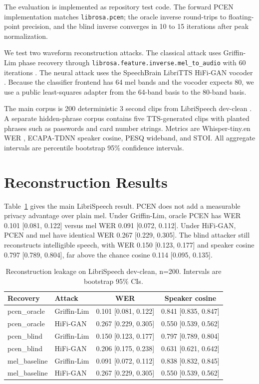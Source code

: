 \documentclass[twocolumn]{article}
\begin{document}
The evaluation is implemented as repository test code. The forward PCEN
implementation matches \texttt{librosa.pcen}; the oracle inverse round-trips
to floating-point precision, and the blind inverse converges in 10 to 15
iterations after peak normalization.

We test two waveform reconstruction attacks. The classical attack uses
Griffin-Lim phase recovery through \texttt{librosa.feature.inverse.mel\_to\_audio}
with 60 iterations \cite{griffinlim1984}. The neural attack uses the
SpeechBrain LibriTTS HiFi-GAN vocoder \cite{kong2020hifigan,speechbrain2021}.
Because the classifier frontend has 64 mel bands and the vocoder expects 80, we
use a public least-squares adapter from the 64-band basis to the 80-band basis.

The main corpus is 200 deterministic 3 second clips from LibriSpeech dev-clean
\cite{panayotov2015librispeech}. A separate hidden-phrase corpus contains five
TTS-generated clips with planted phrases such as passwords and
card number strings. Metrics are Whisper-tiny.en WER
\cite{radford2022whisper}, ECAPA-TDNN speaker cosine, PESQ wideband, and STOI.
All aggregate intervals are percentile bootstrap 95\% confidence intervals.

\section{Reconstruction Results}

Table~\ref{tab:privacy} gives the main LibriSpeech result. PCEN does not add a
measurable privacy advantage over plain mel. Under Griffin-Lim, oracle PCEN
has WER 0.101 [0.081, 0.122] versus mel WER 0.091 [0.072, 0.112]. Under
HiFi-GAN, PCEN and mel have identical WER 0.267 [0.229, 0.305]. The blind
attacker still reconstructs intelligible speech, with WER 0.150 [0.123,
0.177] and speaker cosine 0.797 [0.789, 0.804], far above the chance cosine
0.114 [0.095, 0.135].

\begin{table}[t]
\centering
\tiny
\setlength{\tabcolsep}{2pt}
\begin{tabular}{llcc}
\toprule
Recovery & Attack & WER & Speaker cosine \\
\midrule
pcen\_oracle & Griffin-Lim & 0.101 [0.081, 0.122] & 0.841 [0.835, 0.847] \\
pcen\_oracle & HiFi-GAN & 0.267 [0.229, 0.305] & 0.550 [0.539, 0.562] \\
pcen\_blind & Griffin-Lim & 0.150 [0.123, 0.177] & 0.797 [0.789, 0.804] \\
pcen\_blind & HiFi-GAN & 0.206 [0.175, 0.238] & 0.631 [0.621, 0.642] \\
mel\_baseline & Griffin-Lim & 0.091 [0.072, 0.112] & 0.838 [0.832, 0.845] \\
mel\_baseline & HiFi-GAN & 0.267 [0.229, 0.305] & 0.550 [0.539, 0.562] \\
\bottomrule
\end{tabular}
\caption{Reconstruction leakage on LibriSpeech dev-clean, n=200. Intervals are bootstrap 95\% CIs.}
\label{tab:privacy}
\end{table}
\end{document}
